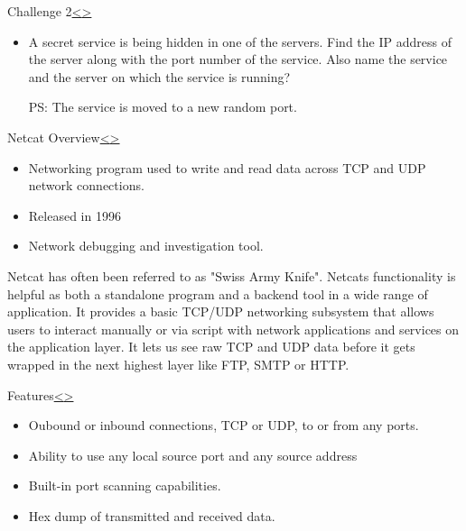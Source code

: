 \documentclass[12pt]{extarticle}
\newenvironment{instructionblock}{\Large\bgroup}{\egroup}
\begin{document}
\pagebreak
\begin{slide}{Challenge 2}{\hyperref[slide 12]{\textless}\hyperref[slide 14]{\textgreater}}
	\vskip 5pt
	\begin{instructionblock}
		\begin{itemize}
			\item A secret service is being hidden in one of the servers. Find the IP address of the server along with the port number of the service. Also name the service and the server on which the service is running?
			\par%
			\bigskip 
			\bigskip
			\bigskip 
			\bigskip
			\bigskip 
			
			PS: The service is moved to a new random port.
		\end{itemize}
	\end{instructionblock}
\end{slide}

\pagebreak
\begin{slide}{Netcat Overview}{\hyperref[slide 13]{\textless}\hyperref[slide 15]{\textgreater}}
\vskip 5pt
\begin{instructionblock}
\begin{itemize}
	\item Networking program used to write and read data across TCP and UDP network connections.
	\item Released in 1996
	\item Network debugging and investigation tool.
\end{itemize}
\end{instructionblock}
\end{slide}
Netcat has often been referred to as "Swiss Army Knife". Netcats functionality is helpful as both a standalone program and a backend tool in a wide range of application. It provides a basic TCP/UDP networking subsystem that allows users to interact manually or via script with network applications and services on the application layer. It lets us see raw TCP and UDP data before it gets wrapped in the next highest layer like FTP, SMTP or HTTP.\cite{Inetcat} 
\pagebreak
\begin{slide}{Features}{\hyperref[slide 14]{\textless}\hyperref[slide 16]{\textgreater}}
\vskip 5pt
\begin{instructionblock}
\begin{itemize}
\item Oubound or inbound connections, TCP or UDP, to or from any ports.
\item Ability to use any local source port and any source address
\item Built-in port scanning capabilities.
\item Hex dump of transmitted and received data.
\end{itemize}
\end{instructionblock}
\end{slide}
\end{document}
